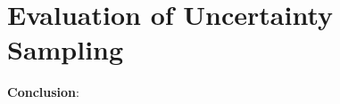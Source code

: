 \section{Evaluation of Uncertainty Sampling}
\label{ch:evaluation:sec:evaluation_uncertainty}










\textbf{Conclusion}:\\